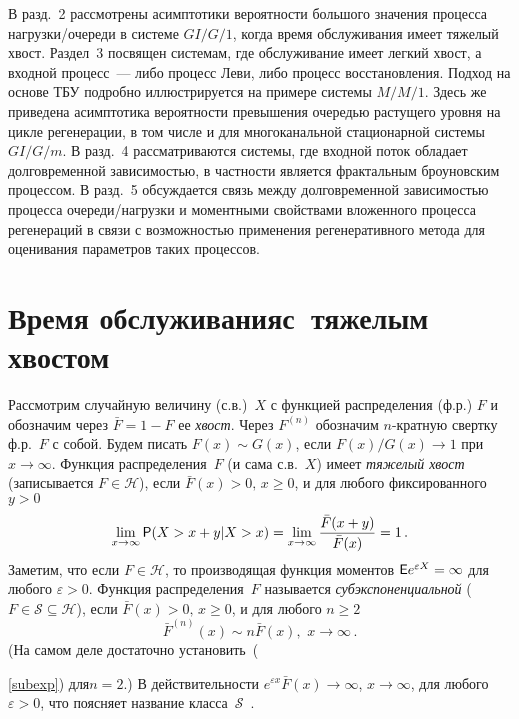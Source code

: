 \begin{multicols}{2}
В разд.~2 рассмотрены асимптотики ве\-ро\-ят\-ности большого значения
процесса нагрузки/очереди в системе $GI/G/1$, когда время
обслуживания имеет тяжелый хвост. Раздел~3 посвящен системам, где
обслуживание имеет легкий хвост, а входной процесс~--- либо процесс
Леви, либо процесс вос\-ста\-нов\-ле\-ния. Подход на основе ТБУ подробно
ил\-люст\-ри\-руется на примере системы $M/M/1$. Здесь же приведена
асимптотика вероятности превышения очередью растущего уровня на
цикле регенерации, в том числе и для многоканальной стационарной
сис\-те\-мы $GI/G/m$. В разд.~4 рассматриваются сис\-темы, где входной
поток обладает долговременной зависимостью, в частности является
фрактальным броуновским процессом. В разд.~5 обсуждается связь
между долговременной зависимостью процесса очереди/нагрузки и
моментными свойствами вложенного процесса регенераций в связи с
возможностью применения регенеративного метода для оценивания
параметров таких процессов.

\section{Время обслуживания\newline с~тяжелым хвостом}

Рассмотрим случайную величину (с.в.)~$X$ с функцией распределения
(ф.р.) $F$ и обозначим через $\bar F=1-F$ ее {\it хвост}. Через
$F^{(n)}$ обозначим  $n$-кратную свертку ф.р.~$F$ с собой.
Будем писать $F(x)\sim G(x)$, если $ F(x)/G(x)\to 1 $ при $x\to\infty$.
Функция распределения~$F$ (и сама с.в.~$X$) имеет {\it тяжелый хвост}
(записывается $F\in\mathcal{H}$), если $\bar F(x)>0,\,x\ge 0$, и для
любого фиксированного $y>0$
\begin{equation*}
\lim_{x\to\infty}{\sf P}(X>x+y|X>x)=\lim_{x\to\infty}\displaystyle\frac{\displaystyle \bar
F(x+y)\mathstrut}{\displaystyle \bar F(x)\mathstrut}= 1\,.
\end{equation*}
Заметим, что если $F\in\mathcal{H}$, то производящая функция
моментов ${\sf E} e^{\varepsilon X}=\infty$ для любого $\varepsilon >0$.
Функция распределения~$F$ называется {\it субэкспоненциальной}
($F\in\mathcal{S} \subseteq \mathcal{H}$), если $\bar F(x)>0,\,x\ge 0$,
и для любого $n\ge 2$
\begin{equation}
\bar F^{(n)}(x)\sim n \bar F(x),\,\,x\to \infty\,.
\label{subexp}
\end{equation}
(На самом деле достаточно установить~({\ref{subexp}) для\linebreak $n= 2$.)
В действительности $e^{\varepsilon x}\bar F(x)\to\infty$, %
$x\to\infty $, для любого $\varepsilon >0$, что поясняет название
клас\-са~$\mathcal{S}$~\cite{Sigman}.

}
\end{multicols}
